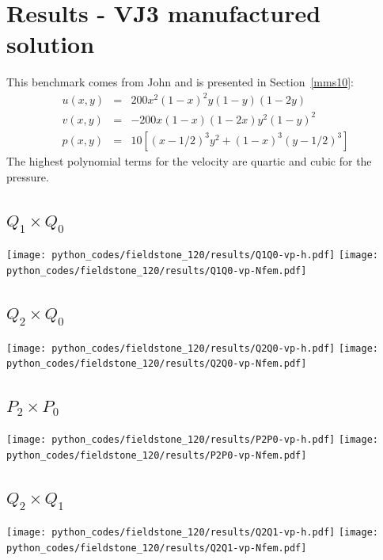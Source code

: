 \newpage
\section*{Results - VJ3 manufactured solution}

This benchmark comes from John \etal \cite{jolm17} and is presented in Section~\ref{mms10}:
\begin{eqnarray}
u(x,y) &=& 200x^2(1-x)^2y(1-y)(1-2y) \\
v(x,y) &=& -200x(1-x)(1-2x)y^2(1-y)^2 \\
p(x,y) &=& 10\left[(x-1/2)^3y^2+(1-x)^3(y-1/2)^3 \right]
\end{eqnarray}
The highest polynomial terms for the velocity are quartic and cubic for the pressure.

\subsection*{$Q_1\times Q_0$}
\begin{center}
\texttt{[image: python\_codes/fieldstone\_120/results/Q1Q0-vp-h.pdf]}
\texttt{[image: python\_codes/fieldstone\_120/results/Q1Q0-vp-Nfem.pdf]}
\end{center}

\subsection*{$Q_2\times Q_0$}
\begin{center}
\texttt{[image: python\_codes/fieldstone\_120/results/Q2Q0-vp-h.pdf]}
\texttt{[image: python\_codes/fieldstone\_120/results/Q2Q0-vp-Nfem.pdf]}
\end{center}

\subsection*{$P_2\times P_0$}
\begin{center}
\texttt{[image: python\_codes/fieldstone\_120/results/P2P0-vp-h.pdf]}
\texttt{[image: python\_codes/fieldstone\_120/results/P2P0-vp-Nfem.pdf]}
\end{center}

\subsection*{$Q_2\times Q_1$}
\begin{center}
\texttt{[image: python\_codes/fieldstone\_120/results/Q2Q1-vp-h.pdf]}
\texttt{[image: python\_codes/fieldstone\_120/results/Q2Q1-vp-Nfem.pdf]}
\end{center}

